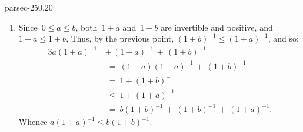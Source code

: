 \documentclass[b5page]{book}
\begin{document}
\begin{solution}{parsec-250.20}
\begin{enumerate}
To complete this part of the exercise 
we must show that given
invertible elements~$a$ and~$b$ of
a $C^*$-algebra~$\scrA$
the following are equivalent.
\begin{multicols}{2}
\begin{enumerate}
\item 
\label{S25II3a}
$a\leq b^{-1}$
\item 
\label{S25II3b}
$\sqrt{b}a\sqrt{b} \leq 1$
\item 
\label{S25II3c}
$\|\sqrt{a}\sqrt{b}\|\leq 1$
\item 
\label{S25II3d}
$b\leq a^{-1}$
\end{enumerate}
\end{multicols}
\ref{S25II3a}$\iff$\ref{S25II3b}.
If~$a\leq b^{-1}$,
then~$\sqrt{b} a\sqrt{b}\leq \sqrt{b}b^{-1}\sqrt{b} = 1$,
by part~1 of this exercise,
where we used that~$\smash{\sqrt{b^{-1}}}$
is the inverse of~$\sqrt{b}$.
On the other hand,
if~$\sqrt{b}a\sqrt{b}\leq 1$,
then~$a\equiv \smash{\sqrt{b}^{-1} \sqrt{b} a \sqrt{b}\sqrt{b}^{-1}}
\leq b^{-1}$, 
again using part~1 of this exercise.

\ref{S25II3b}$\iff$\ref{S25II3c}
follows from~(3)
for by it
$(-1\leq)\sqrt{b}a\sqrt{b}\leq 1$
iff $\|\sqrt{a}\sqrt{b}\|^2\equiv \|\sqrt{b}a\sqrt{b}\|\leq 1$
iff $\|\sqrt{a}\sqrt{b}\|\leq 1$.

\ref{S25II3a}$\iff$\ref{S25II3d}.
Note that since $\|\sqrt{a}\sqrt{b}\| = 
\|(\sqrt{a}\sqrt{b})^*\|=\|\sqrt{b}\sqrt{a}\|$,
we have
$a\leq b^{-1}$
iff~$\|\sqrt{a}\sqrt{b}\|\leq 1$
iff~$\|\sqrt{b}\sqrt{a}\|\leq 1$
iff~$b\leq a^{-1}$.
\item
Since~$0\leq a\leq b$,
both~$1+a$ and~$1+b$
are invertible and positive,
and $1+a\leq 1+b$,
Thus, by the previous point,
$(1+b)^{-1}\leq (1+a)^{-1}$, and so:
\begin{alignat*}{3}
a(1+a)^{-1}
\,&+\, (1+a)^{-1}
\,+\, (1+b)^{-1}\\
&\ =\ 
(1+a)(1+a)^{-1}\,+\, (1+b)^{-1} \\
&\ =\ 1+(1+b)^{-1} \\
&\ \leq\ 1+(1+a)^{-1} \\
&\ =\ 
b(1+b)^{-1}
\,+\, (1+b)^{-1}
\,+\, (1+a)^{-1}.
\end{alignat*}
Whence
$a(1+a)^{-1} \leq b(1+b)^{-1}$.
\end{enumerate}
\end{solution}
\end{document}
